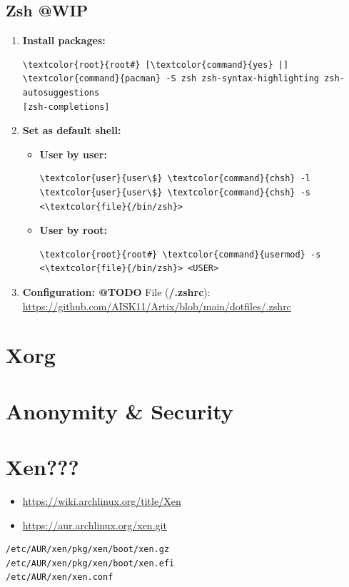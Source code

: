 \documentclass[10pt, a4paper, onecolumn, oneside, titlepage, openany]{book}
\begin{document}
\section{Zsh @WIP}
\begin{enumerate}
    \item \textbf{Install packages:}
\begin{Verbatim}[commandchars=\\\{\}]
\textcolor{root}{root#} [\textcolor{command}{yes} |] \textcolor{command}{pacman} -S zsh zsh-syntax-highlighting zsh-autosuggestions
[zsh-completions]
\end{Verbatim}
    \item \textbf{Set as default shell:}
    \begin{itemize}
        \item \textbf{User by user:}
\begin{Verbatim}[commandchars=\\\{\}]
\textcolor{user}{user\$} \textcolor{command}{chsh} -l
\textcolor{user}{user\$} \textcolor{command}{chsh} -s <\textcolor{file}{/bin/zsh}>
\end{Verbatim}
        \item \textbf{User by root:}
\begin{Verbatim}[commandchars=\\\{\}]
\textcolor{root}{root#} \textcolor{command}{usermod} -s <\textcolor{file}{/bin/zsh}> <USER>
\end{Verbatim}
    \end{itemize}
    \item \textbf{Configuration: @TODO}
\newline File (\textbf{\textcolor{file}{\texttildelow/.zshrc}}):
\newline \url{https://github.com/AISK11/Artix/blob/main/dotfiles/.zshrc}
\end{enumerate}


\chapter{Xorg}


\chapter{Anonymity \& Security}


\chapter{Xen???}
\begin{itemize}
    \item \url{https://wiki.archlinux.org/title/Xen}
    \item \url{https://aur.archlinux.org/xen.git}
\end{itemize}
\begin{Verbatim}[commandchars=\\\{\}]
/etc/AUR/xen/pkg/xen/boot/xen.gz
/etc/AUR/xen/pkg/xen/boot/xen.efi
/etc/AUR/xen/xen.conf
\end{Verbatim}
\end{document}
